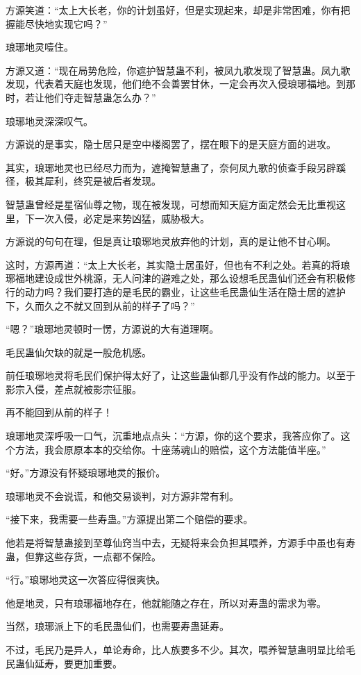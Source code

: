 \begin{this_body}
方源笑道：“太上大长老，你的计划虽好，但是实现起来，却是非常困难，你有把握能尽快地实现它吗？”

琅琊地灵噎住。

方源又道：“现在局势危险，你遮护智慧蛊不利，被凤九歌发现了智慧蛊。凤九歌发现，代表着天庭也发现，他们绝不会善罢甘休，一定会再次入侵琅琊福地。到那时，若让他们夺走智慧蛊怎么办？”

琅琊地灵深深叹气。

方源说的是事实，隐士居只是空中楼阁罢了，摆在眼下的是天庭方面的进攻。

其实，琅琊地灵也已经尽力而为，遮掩智慧蛊了，奈何凤九歌的侦查手段另辟蹊径，极其犀利，终究是被后者发现。

智慧蛊曾经是星宿仙尊之物，现在被发现，可想而知天庭方面定然会无比重视这里，下一次入侵，必定是来势凶猛，威胁极大。

方源说的句句在理，但是真让琅琊地灵放弃他的计划，真的是让他不甘心啊。

这时，方源再道：“太上大长老，其实隐士居虽好，但也有不利之处。若真的将琅琊福地建设成世外桃源，无人问津的避难之处，那么设想毛民蛊仙们还会有积极修行的动力吗？我们要打造的是毛民的霸业，让这些毛民蛊仙生活在隐士居的遮护下，久而久之不就又回到从前的样子了吗？”

“嗯？”琅琊地灵顿时一愣，方源说的大有道理啊。

毛民蛊仙欠缺的就是一股危机感。

前任琅琊地灵将毛民们保护得太好了，让这些蛊仙都几乎没有作战的能力。以至于影宗入侵，差点就被影宗征服。

再不能回到从前的样子！

琅琊地灵深呼吸一口气，沉重地点点头：“方源，你的这个要求，我答应你了。这个方法，我会原原本本的交给你。十座荡魂山的赔偿，这个方法能值半座。”

“好。”方源没有怀疑琅琊地灵的报价。

琅琊地灵不会说谎，和他交易谈判，对方源非常有利。

“接下来，我需要一些寿蛊。”方源提出第二个赔偿的要求。

他若是将智慧蛊接到至尊仙窍当中去，无疑将来会负担其喂养，方源手中虽也有寿蛊，但靠这些存货，一点都不保险。

“行。”琅琊地灵这一次答应得很爽快。

他是地灵，只有琅琊福地存在，他就能随之存在，所以对寿蛊的需求为零。

当然，琅琊派上下的毛民蛊仙们，也需要寿蛊延寿。

不过，毛民乃是异人，单论寿命，比人族要多不少。其次，喂养智慧蛊明显比给毛民蛊仙延寿，要更加重要。


\end{this_body}
